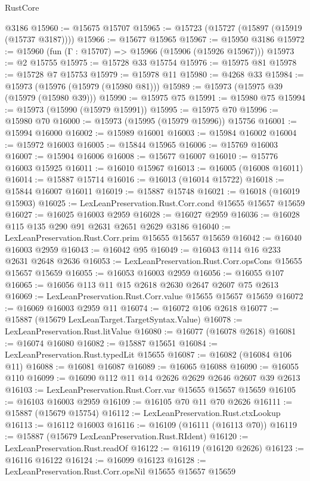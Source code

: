 \begin{lexlean}{RustCore}
\begin{coremodule}
    @3186
@15960 := @15675 @15707
@15965 := @15723 (@15727 (@15897 (@15919 (@15737 @3187))))
@15966 := @15677 @15965
@15967 := @15950 @3186
@15972 := @15960 (fun (Γ : @15707) => @15966 (@15906 (@15926 @15967)))
@15973 := @2 @15755
@15975 := @15728 @33 @15754
@15976 := @15975 @81
@15978 := @15728 @7 @15753
@15979 := @15978 @11
@15980 := @4268 @33
@15984 := @15973 (@15976 (@15979 (@15980 @81)))
@15989 := @15973 (@15975 @39 (@15979 (@15980 @39)))
@15990 := @15975 @75
@15991 := @15980 @75
@15994 := @15973 (@15990 (@15979 @15991))
@15995 := @15975 @70
@15996 := @15980 @70
@16000 := @15973 (@15995 (@15979 @15996)) @15756
@16001 := @15994 @16000
@16002 := @15989 @16001
@16003 := @15984 @16002
@16004 := @15972 @16003
@16005 := @15844 @15965
@16006 := @15769 @16003
@16007 := @15904 @16006
@16008 := @15677 @16007
@16010 := @15776 @16003 @15925
@16011 := @16010 @15967
@16013 := @16005 (@16008 @16011)
@16014 := @15887 @15714
@16016 := @16013 (@16014 @15722)
@16018 := @15844 @16007 @16011
@16019 := @15887 @15748
@16021 := @16018 (@16019 @15903)
@16025 := LexLeanPreservation.Rust.Corr.cond @15655 @15657 @15659
@16027 := @16025 @16003 @2959
@16028 := @16027 @2959
@16036 := @16028 @115 @135 @290 @91 @2631 @2651 @2629 @3186
@16040 := LexLeanPreservation.Rust.Corr.prim @15655 @15657 @15659
@16042 := @16040 @16003 @2959
@16043 := @16042 @95
@16049 := @16043 @114 @16 @233 @2631 @2648 @2636
@16053 := LexLeanPreservation.Rust.Corr.opsCons @15655 @15657 @15659
@16055 := @16053 @16003 @2959
@16056 := @16055 @107
@16065 := @16056 @113 @11 @15 @2618 @2630 @2647 @2607 @75 @2613
@16069 := LexLeanPreservation.Rust.Corr.value @15655 @15657 @15659
@16072 := @16069 @16003 @2959 @11
@16074 := @16072 @106 @2618
@16077 := @15887 (@15679 LexLeanTarget.TargetSyntax.Value)
@16078 := LexLeanPreservation.Rust.litValue
@16080 := @16077 (@16078 @2618)
@16081 := @16074 @16080
@16082 := @15887 @15651
@16084 := LexLeanPreservation.Rust.typedLit @15655
@16087 := @16082 (@16084 @106 @11)
@16088 := @16081 @16087
@16089 := @16065 @16088
@16090 := @16055 @110
@16099 := @16090 @112 @11 @14 @2626 @2629 @2646 @2607 @39 @2613
@16103 := LexLeanPreservation.Rust.Corr.var @15655 @15657 @15659
@16105 := @16103 @16003 @2959
@16109 := @16105 @70 @11 @70 @2626
@16111 := @15887 (@15679 @15754)
@16112 := LexLeanPreservation.Rust.ctxLookup
@16113 := @16112 @16003
@16116 := @16109 (@16111 (@16113 @70))
@16119 := @15887 (@15679 LexLeanPreservation.Rust.RIdent)
@16120 := LexLeanPreservation.Rust.readOf
@16122 := @16119 (@16120 @2626)
@16123 := @16116 @16122
@16124 := @16099 @16123
@16128 := LexLeanPreservation.Rust.Corr.opsNil @15655 @15657 @15659

\end{coremodule}
\end{lexlean}
